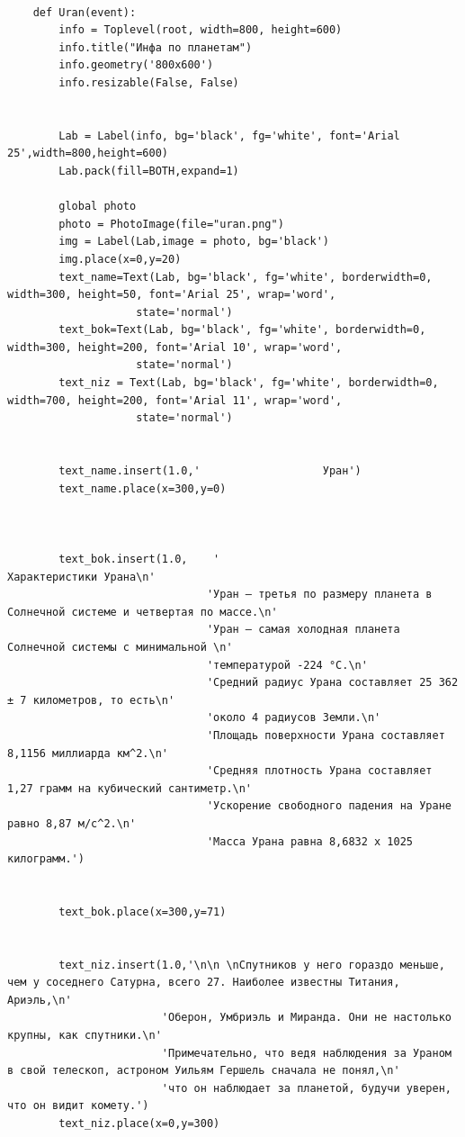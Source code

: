 \documentclass[11pt,a4paper]{report}
\begin{document}
\begin{verbatim}
        
    def Uran(event):  
        info = Toplevel(root, width=800, height=600)
        info.title("Инфа по планетам")
        info.geometry('800x600')
        info.resizable(False, False)
        
        
        Lab = Label(info, bg='black', fg='white', font='Arial 25',width=800,height=600)  
        Lab.pack(fill=BOTH,expand=1)
        
        global photo
        photo = PhotoImage(file="uran.png")
        img = Label(Lab,image = photo, bg='black')
        img.place(x=0,y=20)
        text_name=Text(Lab, bg='black', fg='white', borderwidth=0, width=300, height=50, font='Arial 25', wrap='word',
                    state='normal') 
        text_bok=Text(Lab, bg='black', fg='white', borderwidth=0, width=300, height=200, font='Arial 10', wrap='word',
                    state='normal')  
        text_niz = Text(Lab, bg='black', fg='white', borderwidth=0, width=700, height=200, font='Arial 11', wrap='word',
                    state='normal')  
    
       
        text_name.insert(1.0,'                   Уран')
        text_name.place(x=300,y=0)
        
        
        
        text_bok.insert(1.0,    '                                           Характеристики Урана\n' 
                               'Уран – третья по размеру планета в Солнечной системе и четвертая по массе.\n'
                               'Уран – самая холодная планета Солнечной системы с минимальной \n'
                               'температурой -224 °C.\n'
                               'Средний радиус Урана составляет 25 362 ± 7 километров, то есть\n'
                               'около 4 радиусов Земли.\n'
                               'Площадь поверхности Урана составляет 8,1156 миллиарда км^2.\n'
                               'Средняя плотность Урана составляет 1,27 грамм на кубический сантиметр.\n'
                               'Ускорение свободного падения на Уране равно 8,87 м/c^2.\n'
                               'Масса Урана равна 8,6832 х 1025 килограмм.')
        
        
        text_bok.place(x=300,y=71)        
        
        
        text_niz.insert(1.0,'\n\n \nСпутников у него гораздо меньше, чем у соседнего Сатурна, всего 27. Наиболее известны Титания, Ариэль,\n'
                        'Оберон, Умбриэль и Миранда. Они не настолько крупны, как спутники.\n'
                        'Примечательно, что ведя наблюдения за Ураном в свой телескоп, астроном Уильям Гершель сначала не понял,\n'
                        'что он наблюдает за планетой, будучи уверен, что он видит комету.')
        text_niz.place(x=0,y=300) 
        

\end{verbatim}
\end{document}
